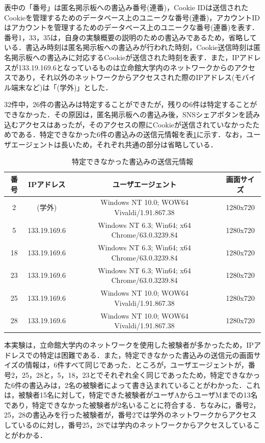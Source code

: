 \documentclass[10pt, a4paper]{jreport}
\begin{document}
表中の「番号」は匿名掲示板への書込み番号(連番)，Cookie IDは送信されたCookieを管理するためのデータベース上のユニークな番号(連番)，アカウントIDはアカウントを管理するためのデータベース上のユニークな番号(連番)を表す．番号1，33，35は，自身の実験概要の説明のための書込みであるため，省略している．書込み時刻は匿名掲示板への書込みが行われた時刻，Cookie送信時刻は匿名掲示板への書込みに対応するCookieが送信された時刻を表す．また，IPアドレスが133.19.169.6となっているものは立命館大学内のネットワークからのアクセスであり，それ以外のネットワークからアクセスされた際のIPアドレス(モバイル端末など)は「(学外)」とした．

32件中，26件の書込みは特定することができたが，残りの6件は特定することができなかった．その原因は，匿名掲示板への書込み後，SNSシェアボタンを読み込むアクセスはあったが，そのアクセスの際にCookieが送信されていなかったためである．特定できなかった6件の書込みの送信元情報を表\ref{tb: exp_result_untracked}に示す．なお，ユーザエージェントは長いため，それぞれ共通の部分は省略している．

\begin{table}[H]
	\caption{特定できなかった書込みの送信元情報}
	\label{tb: exp_result_untracked}
	\begin{center}
		\scalebox{0.8} {
			\begin{tabular}{ | c | c | c | c | } \hline

番号 & IPアドレス & ユーザエージェント & 画面サイズ \\ \hline
2 & (学外) & Windows NT 10.0; WOW64 Vivaldi/1.91.867.38 & 1280x720 \\ \hline
5 & 133.19.169.6 & Windows NT 6.3; Win64; x64 Chrome/63.0.3239.84 & 1280x720 \\ \hline
18 & 133.19.169.6 & Windows NT 6.3; Win64; x64 Chrome/63.0.3239.84 & 1280x720 \\ \hline
23 & 133.19.169.6 & Windows NT 6.3; Win64; x64 Chrome/63.0.3239.84 & 1280x720 \\ \hline
25 & 133.19.169.6 & Windows NT 10.0; WOW64 Vivaldi/1.91.867.38 & 1280x720 \\ \hline
28 & 133.19.169.6 & Windows NT 10.0; WOW64 Vivaldi/1.91.867.38 & 1280x720 \\ \hline

			\end{tabular}
		}
	\end{center}
\end{table}

本実験は，立命館大学内のネットワークを使用した被験者が多かったため，IPアドレスでの特定は困難である．また，特定できなかった書込みの送信元の画面サイズの情報は，6件すべて同じであった．ところが，ユーザエージェントが，番号2，25，28と，5，18，23とでそれぞれ全く同じであったため，特定できなかった6件の書込みは，2名の被験者によって書き込まれていることがわかった．これは，被験者15名に対して，特定できた被験者がユーザAからユーザMまでの13名であり，特定できなかった被験者が2名いることに符合する．ちなみに，番号2，25，28の書込みを行った被験者が，番号2では学外のネットワークからアクセスしているのに対し，番号25，28では学内のネットワークからアクセスしていることがわかる．
\end{document}
